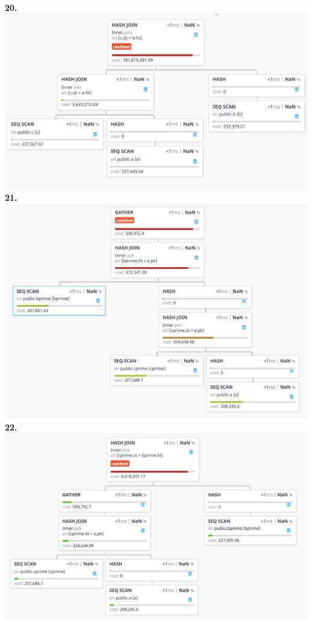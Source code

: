 \documentclass[12pt, letterpaper, fleqn]{article}
\begin{document}
  \textbf{20.}\\
  \includegraphics[scale=0.5]{query_pics/20.png} \\

  \textbf{21.}\\
  \includegraphics[scale=0.5]{query_pics/21.png} \\

  \textbf{22.}\\
  \includegraphics[scale=0.5]{query_pics/22.png} \\
\end{document}
